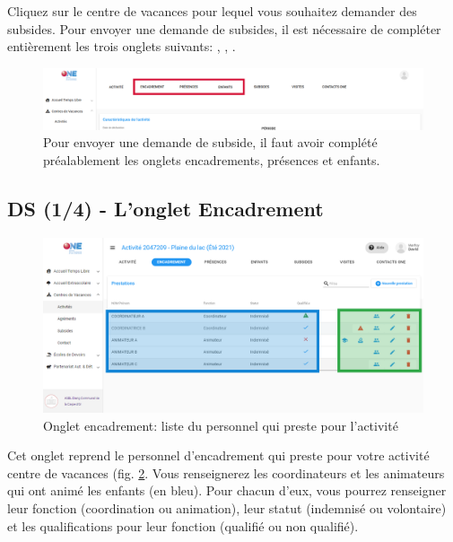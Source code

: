 Cliquez sur le centre de vacances pour lequel vous souhaitez demander des subsides. 
Pour envoyer une demande de subsides, il est nécessaire de compléter entièrement les trois onglets suivants: , , .


\begin{figure}[h!]
    \centering
    \includegraphics[width=16cm]{Images/cdv/cdv-onglets-ds.png}
    \caption{Pour envoyer une demande de subside, il faut avoir complété préalablement les onglets encadrements, présences et enfants.}
    \label{fig:cdv_onglets}
\end{figure}



\subsection{DS (1/4) - L'onglet Encadrement}\label{encadrementcdv}

\begin{figure}[h!]
    \centering
    \includegraphics[width=15cm]{Images/cdv/cdv-ds-encadrement2.png}
    \caption{Onglet encadrement: liste du personnel qui preste pour l'activité}
    \label{fig:cdv_encadrement}
\end{figure}

Cet onglet reprend le personnel d'encadrement qui preste pour  votre activité centre de vacances (fig. \ref{fig:cdv_encadrement}. Vous renseignerez les coordinateurs et les animateurs qui ont animé les enfants (en \textcolor{bleu}{bleu}). Pour chacun d'eux, vous pourrez renseigner leur fonction (coordination ou animation), leur statut (indemnisé ou volontaire) et les qualifications pour leur fonction (qualifié ou non qualifié).

